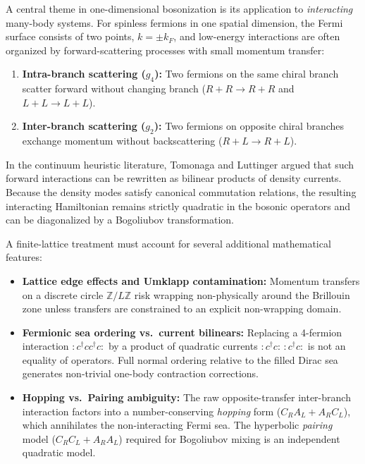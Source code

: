 \begin{remark}
A central theme in one-dimensional bosonization is its application to \emph{interacting} many-body systems. For spinless fermions in one spatial dimension, the Fermi surface consists of two points, $k=\pm k_F$, and low-energy interactions are often organized by forward-scattering processes with small momentum transfer:
\begin{enumerate}
    \item \textbf{Intra-branch scattering ($g_4$):} Two fermions on the same chiral branch scatter forward without changing branch ($R + R \to R + R$ and $L + L \to L + L$).
    \item \textbf{Inter-branch scattering ($g_2$):} Two fermions on opposite chiral branches exchange momentum without backscattering ($R + L \to R + L$).
\end{enumerate}
In the continuum heuristic literature, Tomonaga and Luttinger argued that such forward interactions can be rewritten as bilinear products of density currents. Because the density modes satisfy canonical commutation relations, the resulting interacting Hamiltonian remains strictly quadratic in the bosonic operators and can be diagonalized by a Bogoliubov transformation.

A finite-lattice treatment must account for several additional mathematical features:
\begin{itemize}
    \item \textbf{Lattice edge effects and Umklapp contamination:} Momentum transfers on a discrete circle $\mathbb{Z}/L\mathbb{Z}$ risk wrapping non-physically around the Brillouin zone unless transfers are constrained to an explicit non-wrapping domain.
    \item \textbf{Fermionic sea ordering vs.\ current bilinears:} Replacing a 4-fermion interaction $:c^\dagger c c^\dagger c:$ by a product of quadratic currents $:\!c^\dagger c\!:\,:\!c^\dagger c\!:$ is not an equality of operators. Full normal ordering relative to the filled Dirac sea generates non-trivial one-body contraction corrections.
    \item \textbf{Hopping vs.\ Pairing ambiguity:} The raw opposite-transfer inter-branch interaction factors into a number-conserving \emph{hopping} form ($C_R A_L + A_R C_L$), which annihilates the non-interacting Fermi sea. The hyperbolic \emph{pairing} model ($C_R C_L + A_R A_L$) required for Bogoliubov mixing is an independent quadratic model.
\end{itemize}
\end{remark}

